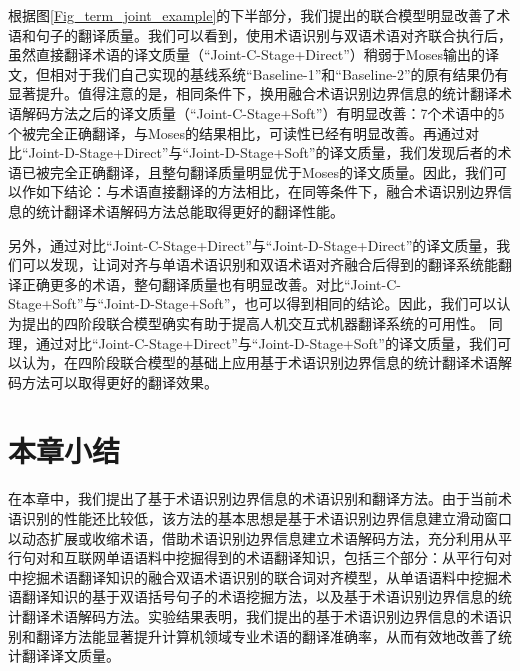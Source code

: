 根据图\ref{Fig_term_joint_example}的下半部分，我们提出的联合模型明显改善了术语和句子的翻译质量。我们可以看到，使用术语识别与双语术语对齐联合执行后，虽然直接翻译术语的译文质量（“Joint-C-Stage+Direct”）稍弱于Moses输出的译文，但相对于我们自己实现的基线系统“Baseline-1”和“Baseline-2”的原有结果仍有显著提升。值得注意的是，相同条件下，换用融合术语识别边界信息的统计翻译术语解码方法之后的译文质量（“Joint-C-Stage+Soft”）有明显改善：7个术语中的5个被完全正确翻译，与Moses的结果相比，可读性已经有明显改善。再通过对比“Joint-D-Stage+Direct”与“Joint-D-Stage+Soft”的译文质量，我们发现后者的术语已被完全正确翻译，且整句翻译质量明显优于Moses的译文质量。因此，我们可以作如下结论：与术语直接翻译的方法相比，在同等条件下，融合术语识别边界信息的统计翻译术语解码方法总能取得更好的翻译性能。

另外，通过对比“Joint-C-Stage+Direct”与“Joint-D-Stage+Direct”的译文质量，我们可以发现，让词对齐与单语术语识别和双语术语对齐融合后得到的翻译系统能翻译正确更多的术语，整句翻译质量也有明显改善。对比“Joint-C-Stage+Soft”与“Joint-D-Stage+Soft”，也可以得到相同的结论。因此，我们可以认为提出的四阶段联合模型确实有助于提高人机交互式机器翻译系统的可用性。
同理，通过对比“Joint-C-Stage+Direct”与“Joint-D-Stage+Soft”的译文质量，我们可以认为，在四阶段联合模型的基础上应用基于术语识别边界信息的统计翻译术语解码方法可以取得更好的翻译效果。

\section{本章小结}

在本章中，我们提出了基于术语识别边界信息的术语识别和翻译方法。由于当前术语识别的性能还比较低，该方法的基本思想是基于术语识别边界信息建立滑动窗口以动态扩展或收缩术语，借助术语识别边界信息建立术语解码方法，充分利用从平行句对和互联网单语语料中挖掘得到的术语翻译知识，包括三个部分：从平行句对中挖掘术语翻译知识的融合双语术语识别的联合词对齐模型，从单语语料中挖掘术语翻译知识的基于双语括号句子的术语挖掘方法，以及基于术语识别边界信息的统计翻译术语解码方法。实验结果表明，我们提出的基于术语识别边界信息的术语识别和翻译方法能显著提升计算机领域专业术语的翻译准确率，从而有效地改善了统计翻译译文质量。